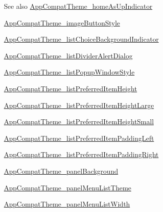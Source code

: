 \begin{DoxySeeAlso}{See also}
\hyperlink{classandroid_1_1support_1_1v7_1_1mediarouter_1_1R_1_1styleable_a1ce96df8d4a5f00bdb41453b81f64749}{App\+Compat\+Theme\+\_\+home\+As\+Up\+Indicator} 

\hyperlink{classandroid_1_1support_1_1v7_1_1mediarouter_1_1R_1_1styleable_a9168d9e2a7a62b5b606d8a6429c93118}{App\+Compat\+Theme\+\_\+image\+Button\+Style} 

\hyperlink{classandroid_1_1support_1_1v7_1_1mediarouter_1_1R_1_1styleable_a0231c101569fa781bb9a5ecba4ff728f}{App\+Compat\+Theme\+\_\+list\+Choice\+Background\+Indicator} 

\hyperlink{classandroid_1_1support_1_1v7_1_1mediarouter_1_1R_1_1styleable_ac591345fbb2242bdd017831f3945bb54}{App\+Compat\+Theme\+\_\+list\+Divider\+Alert\+Dialog} 

\hyperlink{classandroid_1_1support_1_1v7_1_1mediarouter_1_1R_1_1styleable_a20960f3bfbaeac45f2f88f8fdedb6eb8}{App\+Compat\+Theme\+\_\+list\+Popup\+Window\+Style} 

\hyperlink{classandroid_1_1support_1_1v7_1_1mediarouter_1_1R_1_1styleable_a93ebe3b2983e9056ade662b59bf906f0}{App\+Compat\+Theme\+\_\+list\+Preferred\+Item\+Height} 

\hyperlink{classandroid_1_1support_1_1v7_1_1mediarouter_1_1R_1_1styleable_ab27c1a75e8d929dff26ffcc92b6ae2e9}{App\+Compat\+Theme\+\_\+list\+Preferred\+Item\+Height\+Large} 

\hyperlink{classandroid_1_1support_1_1v7_1_1mediarouter_1_1R_1_1styleable_af77cd07fa887ba15990b370f984b0d68}{App\+Compat\+Theme\+\_\+list\+Preferred\+Item\+Height\+Small} 

\hyperlink{classandroid_1_1support_1_1v7_1_1mediarouter_1_1R_1_1styleable_adcdce820a384c778b4746b452ffec297}{App\+Compat\+Theme\+\_\+list\+Preferred\+Item\+Padding\+Left} 

\hyperlink{classandroid_1_1support_1_1v7_1_1mediarouter_1_1R_1_1styleable_ad7f8ba5273c36438148cf9ec4c052103}{App\+Compat\+Theme\+\_\+list\+Preferred\+Item\+Padding\+Right} 

\hyperlink{classandroid_1_1support_1_1v7_1_1mediarouter_1_1R_1_1styleable_a13f22c89f103a45bf6f2cec79f941159}{App\+Compat\+Theme\+\_\+panel\+Background} 

\hyperlink{classandroid_1_1support_1_1v7_1_1mediarouter_1_1R_1_1styleable_a7c342f6f92ed7ad34951015f855a9db3}{App\+Compat\+Theme\+\_\+panel\+Menu\+List\+Theme} 

\hyperlink{classandroid_1_1support_1_1v7_1_1mediarouter_1_1R_1_1styleable_ab0f7f7adcabb13c0fbfe3555aa27d52e}{App\+Compat\+Theme\+\_\+panel\+Menu\+List\+Width} 


\end{DoxySeeAlso}
